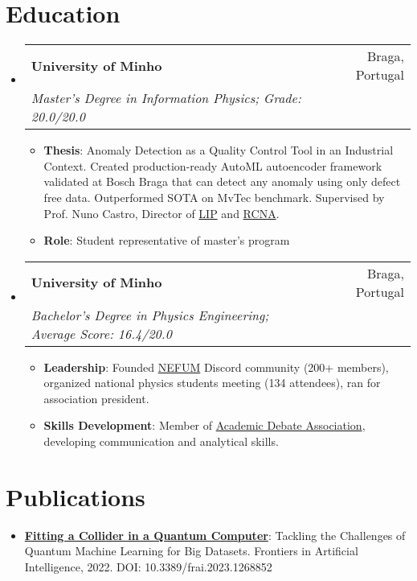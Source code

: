 \documentclass[letterpaper,11pt]{article}
\makeatletter
\newcommand{\resumeItem}[2]{
  \item\small{
    \textbf{#1}{: #2 \vspace{-2pt}}
  }
}
\newcommand{\resumeSubheading}[4]{
  \vspace{-1pt}\item
    \begin{tabular*}{0.97\textwidth}[t]{l@{\extracolsep{\fill}}r}
      \textbf{#1} & #2 \\
      \textit{\small#3} & \textit{\small #4} \\
    \end{tabular*}\vspace{-5pt}
}
\newcommand{\resumeSubItem}[2]{\resumeItem{#1}{#2}\vspace{-4pt}}
\newcommand{\resumeSubHeadingListStart}{\begin{itemize}[leftmargin=*]}
\newcommand{\resumeSubHeadingListEnd}{\end{itemize}}
\newcommand{\resumeItemListStart}{\begin{itemize}}
\newcommand{\resumeItemListEnd}{\end{itemize}\vspace{-5pt}}
\makeatother
\begin{document}
\section{Education}
  \resumeSubHeadingListStart
    \resumeSubheading
      {University of Minho}{Braga, Portugal}
      {Master's Degree in Information Physics; Grade: 20.0/20.0}{}
      \resumeItemListStart
        \resumeItem{Thesis}
          {Anomaly Detection as a Quality Control Tool in an Industrial Context. Created production-ready AutoML autoencoder framework validated at Bosch Braga that can detect any anomaly using only defect free data. Outperformed SOTA on MvTec benchmark.  Supervised by Prof. Nuno Castro, Director of \href{https://www.lip.pt/}{LIP} and \href{https://rnca.fccn.pt/en/}{RCNA}.}
        \resumeItem{Role}{Student representative of master's program}
      \resumeItemListEnd
    \resumeSubheading
      {University of Minho}{Braga, Portugal}
      {Bachelor's Degree in Physics Engineering; Average Score: 16.4/20.0}{}
      \resumeItemListStart
        \resumeItem{Leadership}
          {Founded \href{https://nefum.di.uminho.pt/}{NEFUM} Discord community (200+ members), organized national physics students meeting (134 attendees), ran for association president.}
        \resumeItem{Skills Development}{Member of \href{https://aedum.com/}{Academic Debate Association}, developing communication and analytical skills.}
      \resumeItemListEnd
  \resumeSubHeadingListEnd

\section{Publications}
  \resumeSubHeadingListStart
    \resumeSubItem{\href{https://www.frontiersin.org/journals/artificial-intelligence/articles/10.3389/frai.2023.1268852/full}{Fitting a Collider in a Quantum Computer}}
      {Tackling the Challenges of Quantum Machine Learning for Big Datasets. Frontiers in Artificial Intelligence, 2022. DOI: 10.3389/frai.2023.1268852}
  \resumeSubHeadingListEnd

\end{document}
